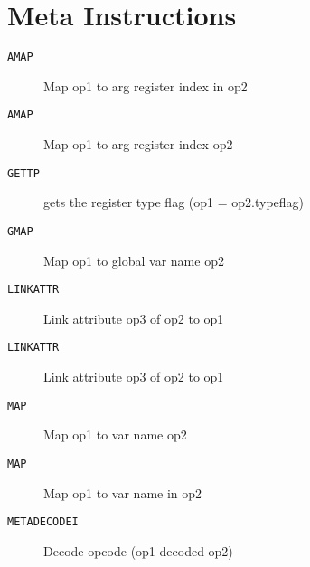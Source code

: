 \section{Meta Instructions}
\begin{description}
\item[\texttt{AMAP}]  Map op1 to arg register index in op2\\

\end{description}
\begin{description}
\item[\texttt{AMAP}]  Map op1 to arg register index  op2\\

\end{description}
\begin{description}
\item[\texttt{GETTP}]  gets the register type flag (op1 = op2.typeflag)\\

\end{description}
\begin{description}
\item[\texttt{GMAP}]  Map op1 to global var name op2\\

\end{description}
\begin{description}
\item[\texttt{LINKATTR}]  Link attribute op3 of op2 to op1\\

\end{description}
\begin{description}
\item[\texttt{LINKATTR}]  Link attribute op3 of op2 to op1\\

\end{description}
\begin{description}
\item[\texttt{MAP}]  Map op1 to var name op2\\

\end{description}
\begin{description}
\item[\texttt{MAP}]  Map op1 to var name in op2\\

\end{description}
\begin{description}
\item[\texttt{METADECODEI}]      Decode opcode (op1 decoded op2)\\

\end{description}
